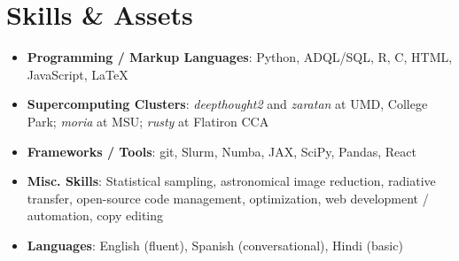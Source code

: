 \documentclass[letterpaper,10.5pt]{article}
\newcommand{\resumeSubHeadingListStart}{\begin{itemize}[leftmargin=*]}
\newcommand{\resumeSubHeadingListEnd}{\end{itemize}}
\newcommand{\shorterSection}[1]{\vspace{-10pt}\section{#1}}
\begin{document}
\shorterSection{Skills \& Assets}
  \resumeSubHeadingListStart
  \small
    \item{
     \textbf{Programming / Markup Languages}{: Python, ADQL/SQL, R, C, HTML, JavaScript, \LaTeX}
    }
    \vspace{-5pt}
    \item{
     \textbf{Supercomputing Clusters}{: \textit{deepthought2} and \textit{zaratan} at UMD, College Park; \textit{moria} at MSU; \textit{rusty} at Flatiron CCA}
    }
    \vspace{-5pt}
    \item{
     \textbf{Frameworks / Tools}{: git, Slurm, Numba, JAX, SciPy, Pandas, React}
    }
    \vspace{-5pt}
    \item{
     \textbf{Misc. Skills}{: Statistical sampling, astronomical image reduction, radiative transfer, open-source code management, optimization, web development / automation, copy editing}
    }
    \vspace{-5pt}
    \item{
     \textbf{Languages}{: English (fluent), Spanish (conversational), Hindi (basic)}
    }
\resumeSubHeadingListEnd
\end{document}
